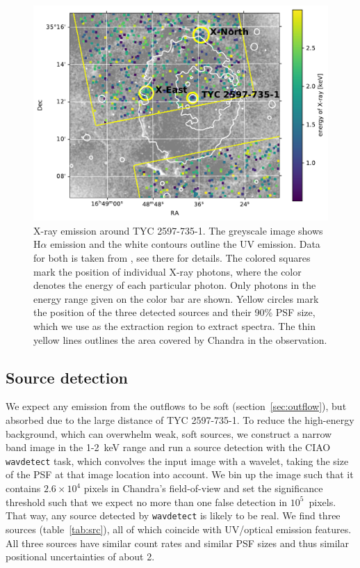 \documentclass[linenumbers]{aastex631}
\begin{document}
\begin{figure}
    \centering
    \includegraphics[width=\textwidth]{figures/chandraimage.pdf}
    \caption{X-ray emission around TYC 2597-735-1. The greyscale image shows H$\alpha$ emission and the white contours outline the UV emission. Data for both is taken from \citet{2020Natur.587..387H}, see there for details. The colored squares mark the position of individual X-ray photons, where the color denotes the energy of each particular photon. Only photons in the energy range given on the color bar are shown. Yellow circles mark the position of the three detected sources and their 90\% PSF size, which we use as the extraction region to extract spectra. The thin yellow lines outlines the area covered by Chandra in the observation.}
    \label{fig:chandraimage}
\end{figure}

\subsection{Source detection}
We expect any emission from the outflows to be soft (section~\ref{sec:outflow}), but absorbed due to the large distance of TYC 2597-735-1. To reduce the high-energy background, which can overwhelm weak, soft sources, we construct a narrow band image in the 1-2~keV range
and run a source detection with the CIAO \texttt{wavdetect} task, which convolves the input image with a wavelet, taking the size of the PSF at that image location into account. We bin up the image such that it contains $2.6\times10^4$ pixels in Chandra's field-of-view and set the significance threshold such that we expect no more than one false detection in $10^5$~pixels. That way, any source detected by \texttt{wavdetect} is likely to be real. We find three sources (table~\ref{tab:src}), all of which coincide with UV/optical emission features. All three sources have similar count rates and similar PSF sizes and thus similar positional uncertainties of about 2\arcsec{}.
\end{document}
